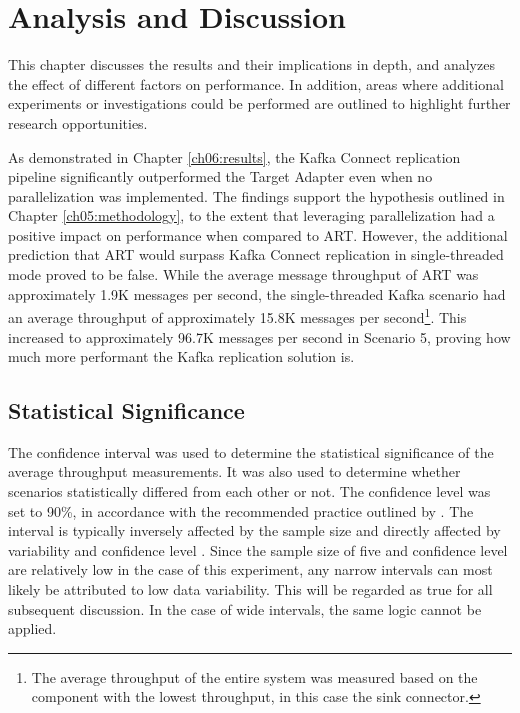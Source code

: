 \chapter{Analysis and Discussion}
\label{ch07:discussion}
This chapter discusses the results and their implications in depth, and analyzes the effect of different factors on performance. In addition, areas where additional experiments or investigations could be performed are outlined to highlight further research opportunities.

As demonstrated in Chapter \ref{ch06:results}, the Kafka Connect replication pipeline significantly outperformed the Target Adapter even when no parallelization was implemented. The findings support the hypothesis outlined in Chapter \ref{ch05:methodology}, to the extent that leveraging parallelization had a positive impact on performance when compared to \ac{ART}. However, the additional prediction that \ac{ART} would surpass Kafka Connect replication in single-threaded mode proved to be false. While the average message throughput of \ac{ART} was approximately 1.9K messages per second, the single-threaded Kafka scenario had an average throughput of approximately 15.8K messages per second\footnote{The average throughput of the entire system was measured based on the component with the lowest throughput, in this case the sink connector.}. This increased to approximately 96.7K messages per second in Scenario 5, proving how much more performant the Kafka replication solution is.

\section{Statistical Significance}
\label{ch07:discussion:statsig}
The confidence interval was used to determine the statistical significance of the average throughput measurements. It was also used to determine whether scenarios statistically differed from each other or not. The confidence level was set to 90\%, in accordance with the recommended practice outlined by \citeauthor{jain1991computer} \cite{jain1991computer}. The interval is typically inversely affected by the sample size and directly affected by variability and confidence level \cite{hazrausingci}. Since the sample size of five and confidence level are relatively low in the case of this experiment, any narrow intervals can most likely be attributed to low data variability. This will be regarded as true for all subsequent discussion. In the case of wide intervals, the same logic cannot be applied.

